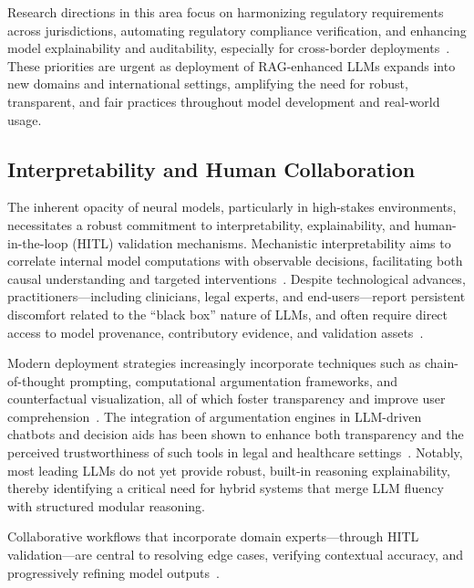 \documentclass[sigconf]{acmart}
\begin{document}
Research directions in this area focus on harmonizing regulatory requirements across jurisdictions, automating regulatory compliance verification, and enhancing model explainability and auditability, especially for cross-border deployments~\cite{ref17,ref29,ref30}. These priorities are urgent as deployment of RAG-enhanced LLMs expands into new domains and international settings, amplifying the need for robust, transparent, and fair practices throughout model development and real-world usage.

\subsection{Interpretability and Human Collaboration}

The inherent opacity of neural models, particularly in high-stakes environments, necessitates a robust commitment to interpretability, explainability, and human-in-the-loop (HITL) validation mechanisms. Mechanistic interpretability aims to correlate internal model computations with observable decisions, facilitating both causal understanding and targeted interventions~\cite{ref13,ref17,ref23,ref27,ref32,ref33,ref34,ref39,ref40,ref41,ref50,ref54,ref55,ref63,ref64}. Despite technological advances, practitioners—including clinicians, legal experts, and end-users—report persistent discomfort related to the “black box” nature of LLMs, and often require direct access to model provenance, contributory evidence, and validation assets~\cite{ref40,ref54,ref55}.

Modern deployment strategies increasingly incorporate techniques such as chain-of-thought prompting, computational argumentation frameworks, and counterfactual visualization, all of which foster transparency and improve user comprehension~\cite{ref13,ref27,ref34,ref39,ref41,ref63,ref64}. The integration of argumentation engines in LLM-driven chatbots and decision aids has been shown to enhance both transparency and the perceived trustworthiness of such tools in legal and healthcare settings~\cite{ref39,ref40,ref54}. Notably, most leading LLMs do not yet provide robust, built-in reasoning explainability, thereby identifying a critical need for hybrid systems that merge LLM fluency with structured modular reasoning.

Collaborative workflows that incorporate domain experts—through HITL validation—are central to resolving edge cases, verifying contextual accuracy, and progressively refining model outputs~\cite{ref50,ref54,ref63,ref64}.
\end{document}
